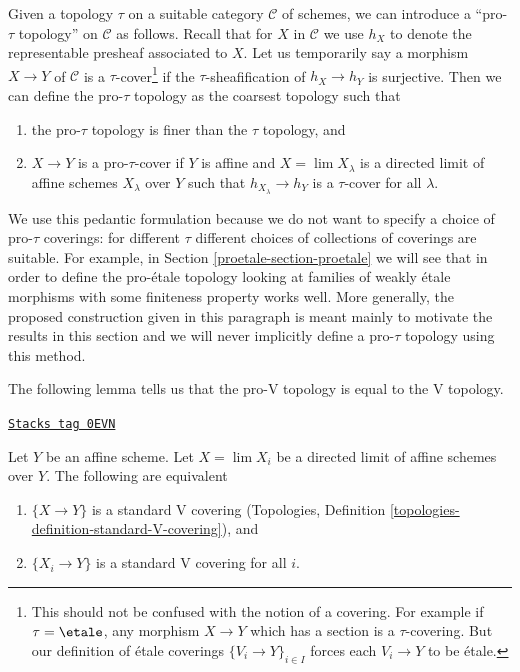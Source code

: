 \medskip\noindent
Given a topology $\tau$ on a suitable category $\mathcal{C}$
of schemes, we can introduce a ``pro-$\tau$ topology''
on $\mathcal{C}$ as follows. Recall that for $X$ in $\mathcal{C}$
we use $h_X$ to denote the representable presheaf associated to $X$.
Let us temporarily say a morphism $X \to Y$ of $\mathcal{C}$
is a $\tau$-cover\footnote{This should not be confused with
the notion of a covering. For example if $\tau = \etale$,
any morphism $X \to Y$ which has a section is a $\tau$-covering. But our
definition of \'etale coverings $\{V_i \to Y\}_{i \in I}$
forces each $V_i \to Y$ to be \'etale.}
if the $\tau$-sheafification of $h_X \to h_Y$
is surjective. Then we can define the pro-$\tau$ topology
as the coarsest topology such that
\begin{enumerate}
\item the pro-$\tau$ topology is finer than the $\tau$ topology, and
\item $X \to Y$ is a pro-$\tau$-cover if
$Y$ is affine and $X = \lim X_\lambda$ is a directed
limit of affine schemes $X_\lambda$ over $Y$ such that
$h_{X_\lambda} \to h_Y$ is a $\tau$-cover for all $\lambda$.
\end{enumerate}
We use this pedantic formulation because we do not want to
specify a choice of pro-$\tau$ coverings: for different $\tau$
different choices of collections of coverings are suitable.
For example, in Section \ref{proetale-section-proetale} we will see that
in order to define the pro-\'etale topology looking at families
of weakly \'etale morphisms with some finiteness property works well.
More generally, the proposed construction given in this paragraph is
meant mainly to motivate the results in this section and we will never
implicitly define a pro-$\tau$ topology using this method.

\medskip\noindent
The following lemma tells us that the
pro-V topology is equal to the V topology.

\begin{lemma}[Pro V V]
\label{proetale-lemma-pro-V-V}
\href{https://stacks.math.columbia.edu/tag/0EVN}{\texttt{Stacks tag 0EVN}}

Let $Y$ be an affine scheme. Let $X = \lim X_i$ be a directed limit
of affine schemes over $Y$. The following are equivalent
\begin{enumerate}
\item $\{X \to Y\}$ is a standard V covering
(Topologies, Definition \ref{topologies-definition-standard-V-covering}), and
\item $\{X_i \to Y\}$ is a standard V covering for all $i$.
\end{enumerate}
\end{lemma}

